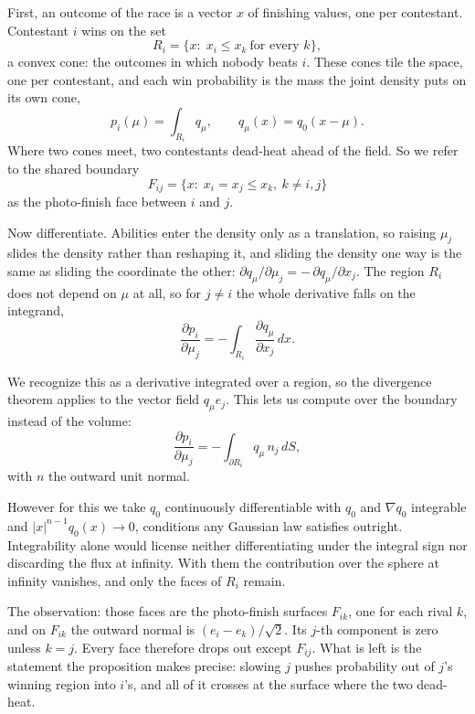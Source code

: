 \documentclass[11pt]{article}
\begin{document}
First, an outcome of the race is a vector $x$ of finishing values, one per
contestant. Contestant $i$ wins on the set
\[
  R_i=\{x:\;x_i\le x_k\ \text{for every }k\},
\]
a convex cone: the outcomes in which nobody beats $i$. These cones tile
the space, one per contestant, and each win probability is the mass the
joint density puts on its own cone,
\[
  p_i(\mu)=\int_{R_i}q_\mu,\qquad q_\mu(x)=q_0(x-\mu).
\]
Where two cones meet, two contestants dead-heat ahead of the field. So we refer to the
shared boundary
\[
  F_{ij}=\{x:\;x_i=x_j\le x_k,\ k\ne i,j\}
\]
as the photo-finish face between $i$ and $j$.

Now differentiate. Abilities enter the density only as a translation, so
raising $\mu_j$ slides the density rather than reshaping it, and sliding
the density one way is the same as sliding the coordinate the other:
$\partial q_\mu/\partial\mu_j=-\,\partial q_\mu/\partial x_j$. The region
$R_i$ does not depend on $\mu$ at all, so for $j\ne i$ the whole
derivative falls on the integrand,
\[
  \frac{\partial p_i}{\partial\mu_j}
   =-\int_{R_i}\frac{\partial q_\mu}{\partial x_j}\,dx .
\]

We recognize this as a derivative integrated over a region, so the
divergence theorem applies to the vector field $q_\mu e_j$. This lets us
compute over the boundary instead of the volume:
\[
  \frac{\partial p_i}{\partial\mu_j}
   =-\int_{\partial R_i}q_\mu\,n_j\,dS ,
\]
with $n$ the outward unit normal.

However for this we take $q_0$ continuously differentiable with $q_0$ and
$\nabla q_0$ integrable and $|x|^{n-1}q_0(x)\to0$, conditions any
Gaussian law satisfies outright. Integrability alone would
license neither differentiating under the integral sign nor discarding
the flux at infinity. With them the contribution over the sphere at
infinity vanishes, and only the faces of $R_i$ remain.

The observation: those faces are the photo-finish surfaces $F_{ik}$, one
for each rival $k$, and on $F_{ik}$ the outward normal is
$(e_i-e_k)/\sqrt2$. Its $j$-th component is zero unless $k=j$. Every face
therefore drops out except $F_{ij}$. What is left is the statement the
proposition makes precise: slowing $j$ pushes probability out of $j$'s
winning region into $i$'s, and all of it crosses at the surface where the
two dead-heat.
\end{document}
